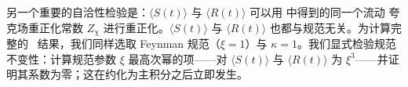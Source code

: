 另一个重要的自洽性检验是：$\langle S(t) \rangle$ 与
$\langle R(t) \rangle$ 可以用  中得到的同一个流动
夸克场重正化常数 $Z_\chi$ 进行重正化。$\langle S(t) \rangle$ 与 $\langle
R(t)\rangle$ 也都与规范无关。为计算完整的 \nnlo\ 结果，我们同样选取 Feynman
规范（$\xi=1$）与 $\kappa=1$。我们显式检验规范不变性：计算规范参数 $\xi$
最高次幂的项——对 $\langle S(t) \rangle$ 与 $\langle R(t)\rangle$ 为
$\xi^3$——并证明其系数为零；这在约化为主积分之后立即发生。
